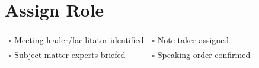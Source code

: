 
\section{Assign Role}
\label{sec:role}

\begin{tabular}{p{9cm} p{8cm}}
$\square$ Meeting leader/facilitator identified & $\square$ Note-taker assigned \\ 
$\square$ Subject matter experts briefed & $\square$ Speaking order confirmed \\ 
\end{tabular}

